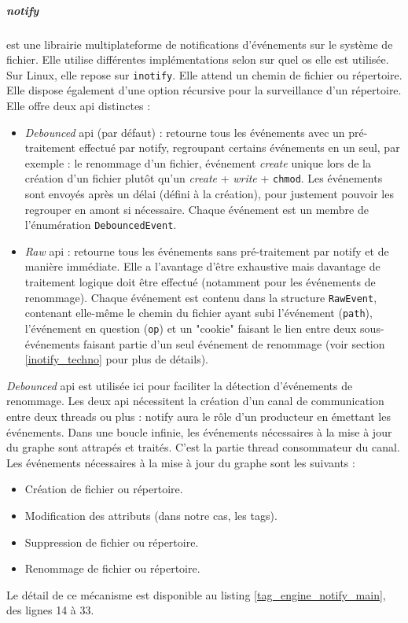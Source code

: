 \subparagraph{notify}\label{tag_engine_notify}
est une librairie multiplateforme de notifications d'événements sur le système de fichier. 
Elle utilise différentes implémentations selon sur quel \acrshort{os} elle est utilisée. Sur Linux, 
elle repose sur \texttt{inotify}. Elle attend un chemin de fichier ou répertoire. Elle 
dispose également d'une option récursive pour la surveillance d'un répertoire. Elle offre deux 
\acrshort{api} distinctes :
\begin{itemize}
    \item \textit{Debounced} \acrshort{api} (par défaut) : retourne tous les événements avec un 
        pré-traitement effectué par notify, regroupant certains événements en un seul, par exemple :
        le renommage d'un fichier, événement \textit{create} unique lors de la création d'un fichier 
        plutôt qu'un \textit{create} + \textit{write} + \texttt{chmod}. Les événements 
        sont envoyés après un délai (défini à la création), pour justement pouvoir les regrouper 
        en amont si nécessaire. Chaque événement est un membre de l'énumération \texttt{DebouncedEvent}.
    \item \textit{Raw} \acrshort{api} : retourne tous les événements sans pré-traitement par notify 
        et de manière immédiate. Elle a l'avantage d'être exhaustive mais davantage de traitement 
        logique doit être effectué (notamment pour les événements de renommage). Chaque événement 
        est contenu dans la structure \texttt{RawEvent}, contenant elle-même le chemin 
        du fichier ayant subi l'événement (\texttt{path}), l'événement en question 
        (\texttt{op}) et un "cookie" faisant le lien entre deux sous-événements faisant 
        partie d'un seul événement de renommage (voir section \ref{inotify_techno} pour plus de détails).
\end{itemize}
\textit{Debounced} \acrshort{api} est utilisée ici pour faciliter la détection d'événements de 
renommage. Les deux \acrshort{api} nécessitent la création d'un canal de communication entre deux 
threads ou plus : notify aura le rôle d'un producteur en émettant les événements. Dans une boucle 
infinie, les événements nécessaires à la mise à jour du graphe sont attrapés et traités. C'est la 
partie thread consommateur du canal. Les événements nécessaires à la mise à jour du graphe sont 
les suivants :
\begin{itemize}
    \item Création de fichier ou répertoire.
    \item Modification des attributs (dans notre cas, les tags).
    \item Suppression de fichier ou répertoire. 
    \item Renommage de fichier ou répertoire.
\end{itemize}
Le détail de ce mécanisme est disponible au listing \ref{tag_engine_notify_main}, des lignes 14 à 33.

